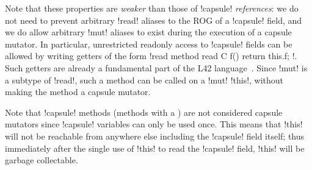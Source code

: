 
Note that these properties are \emph{weaker} than those of \Q!capsule! \emph{references}: we do not need to prevent arbitrary \Q!read! aliases to the ROG of a \Q!capsule! field, and we do allow arbitrary \Q!mut! aliases  to exist during the execution of a capsule mutator. In particular, unrestricted readonly access to \Q!capsule! fields can be allowed by writing getters of the form \Q!read method read C f() { return this.f; }!. Such getters are already a fundamental part of the L42 language~\cite{DBLP:journals/programming/AroraSO19}. Since \Q!mut! is a subtype of \Q!read!, such a method can be called on a \Q!mut! \Q!this!, without making the method a capsule mutator.

Note that \Q!capsule! methods (methods with a \Q@capsule@ \Q@this@) are not considered capsule mutators since \Q!capsule! variables can only be used once. This means that \Q!this! will not be reachable from anywhere else including the \Q!capsule! field itself; thus immediately after the single use of \Q!this! to read the \Q!capsule! field, \Q!this! will be garbage collectable.




